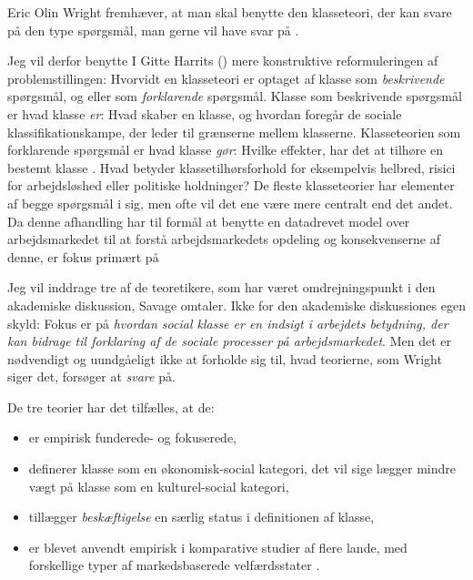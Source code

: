 Eric Olin Wright fremhæver, at man skal benytte den klasseteori, der kan svare på den type spørgsmål, man gerne vil have svar på \parencite[330]{Lareau2008}. 



Jeg vil derfor benytte I Gitte Harrits (\citeyear{Harrits2014})  mere konstruktive reformuleringen af problemstillingen: Hvorvidt en klasseteori er optaget af klasse som \emph{beskrivende} spørgsmål, og eller som \emph{forklarende} spørgsmål. Klasse som beskrivende spørgsmål er hvad klasse \emph{er}: Hvad skaber en klasse, og hvordan foregår de sociale klassifikationskampe, der leder til grænserne mellem klasserne. Klasseteorien som forklarende spørgsmål er hvad klasse \emph{gør}: Hvilke effekter, har det at tilhøre en bestemt klasse \parencite[19]{Harrits2014}. Hvad betyder klassetilhørsforhold for eksempelvis helbred, risici for arbejdsløshed eller politiske holdninger? De fleste klasseteorier har elementer af begge spørgsmål i sig, men ofte vil det ene være mere centralt end det andet. Da denne afhandling har til formål at benytte en datadrevet model over arbejdsmarkedet til at forstå arbejdsmarkedets opdeling og konsekvenserne af denne, er fokus primært på %

Jeg vil inddrage tre af de teoretikere, som har været omdrejningspunkt i den akademiske diskussion, Savage omtaler. Ikke for den akademiske diskussiones egen skyld: Fokus er på \emph{hvordan social klasse er en indsigt i arbejdets betydning, der kan bidrage til forklaring af de sociale processer på arbejdsmarkedet}. Men det er nødvendigt og uundgåeligt ikke at forholde sig til, hvad teorierne, som Wright siger det, forsøger at \emph{svare} på. 
 
De tre teorier har det tilfælles, at de:
%
\begin{itemize}
 \itemsep -0.5em
 	\item er empirisk funderede- og fokuserede,
 	\item definerer klasse som en økonomisk-social kategori, det vil sige lægger mindre vægt på klasse som en kulturel-social kategori,
 	\item tillægger \emph{beskæftigelse} en særlig status i definitionen af klasse,
 	\item er blevet anvendt empirisk i komparative studier af flere lande, med forskellige typer af markedsbaserede velfærdsstater \textcite{Esping-Andersen1990}.
\end{itemize}
%

